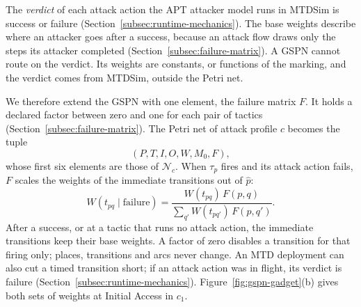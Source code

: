 \documentclass{cshonours}
\begin{document}
The \emph{verdict} of each attack action the APT attacker model runs in MTDSim
is success or failure (Section~\ref{subsec:runtime-mechanics}). The base weights describe where an
attacker goes after a success, because an attack flow draws only the steps
its attacker completed (Section~\ref{subsec:failure-matrix}). A
GSPN cannot route on the verdict. Its weights are constants, or functions of
the marking, and the verdict comes from MTDSim, outside the Petri net.

We therefore extend the GSPN with one element, the failure matrix $F$. It holds a
declared factor between zero and one for each pair of tactics
(Section~\ref{subsec:failure-matrix}). The Petri net of attack profile $c$
becomes the tuple
\begin{equation}
  (P, T, I, O, W, M_0, F),
  \label{eq:vc-net}
\end{equation}
whose first six elements are those of $\mathcal{N}_c$.
When $\tau_p$ fires and its attack action fails, $F$ scales the weights of
the immediate transitions out of $\hat{p}$:
\begin{equation}
  W(t_{pq} \mid \text{failure}) =
  \frac{W(t_{pq})\, F(p, q)}{\sum_{q'} W(t_{pq'})\, F(p, q')}.
  \label{eq:routing}
\end{equation}
After a success, or at a tactic that runs no attack action, the
immediate transitions keep their base weights. A factor of zero disables a
transition for that firing only; places, transitions and arcs never change.
An MTD deployment can also cut a timed transition short; if an attack action
was in flight, its verdict is failure (Section~\ref{subsec:runtime-mechanics}). Figure~\ref{fig:gspn-gadget}(b)
gives both sets of weights at Initial Access in $c_1$.

\end{document}
